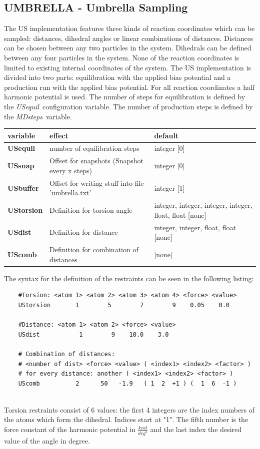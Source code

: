 \documentclass[10pt,a4paper]{article} %
\begin{document}
	\subsection{UMBRELLA - Umbrella Sampling}
	The \acf{US}\supercite{umbrellasampling1, umbrellasampling2, umbrellasamplingreview} implementation features three kinds of reaction coordinates which can be sampled: distances, dihedral angles or linear combinations of distances. Distances can be chosen between any two particles in the system. Dihedrals can be defined between any four particles in the system. None of the reaction coordinates is limited to existing internal coordinates of the system.
	The \acl{US} implementation is divided into two parts: equilibration with the applied bias potential and a production run with the applied bias potential. For all reaction coordinates a half harmonic potential is used. The number of steps for equilibration is defined by the \glqq\textit{USequil}\grqq~configuration variable. The number of production steps is defined by the \glqq\textit{MDsteps}\grqq~variable.

	\begin{longtable}{|p{3cm}|p{5cm}|p{3cm}|}
		variable & effect & default \\
		\hline
		\textbf{USequil} & number of equilibration steps & integer [0] \\
		\textbf{USsnap} & Offset for snapshots (Snapshot every x steps) & integer [0]  \\
		\textbf{USbuffer} & Offset for writing stuff into file 'umbrella.txt' & integer [1]  \\
		\textbf{UStorsion} & Definition for torsion angle & integer, integer, integer, integer, float, float [none] \\
		\textbf{USdist} & Definition for distance & integer, integer, float, float [none] \\
		\textbf{UScomb} & Definition for combination of distances & [none] \\
	\end{longtable}

	The syntax for the definition of the restraints can be seen in the following listing:\\
    
	\begin{lstlisting}
	#Torsion: <atom 1> <atom 2> <atom 3> <atom 4> <force> <value>
	UStorsion       1        5        7        9    0.05    0.0
	
	#Distance: <atom 1> <atom 2> <force> <value>
	USdist           1        9    10.0    3.0
	
	# Combination of distances:
	# <number of dist> <force> <value> ( <index1> <index2> <factor> ) 
	# for every distance: another ( <index1> <index2> <factor> ) 
	UScomb          2      50   -1.9   ( 1  2  +1 ) (  1  6  -1 )
	\end{lstlisting}
	~\\
	Torsion restraints consist of 6 values: the first 4 integers are the index numbers of the atoms which form the dihedral. Indices start at "1". The fifth number is the force constant of the harmonic potential in $\frac{kcal}{deg^2}$ and the last index the desired value of the angle in degree.
	
\end{document}
